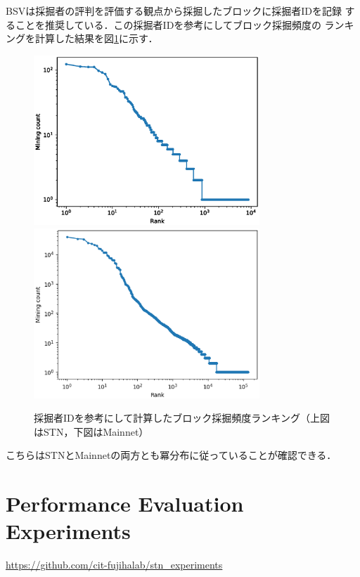 \documentclass[graybox]{svmult}
\begin{document}
BSVは採掘者の評判を評価する観点から採掘したブロックに採掘者IDを記録
することを推奨している．この採掘者IDを参考にしてブロック採掘頻度の
ランキングを計算した結果を図\ref{fig:minerrank}に示す．
%
\begin{figure}[tb]
  \vspace{-20mm}
  \begin{center}
    \includegraphics[width=85mm]{bsv_stn-block_miners-ranking-loglog.eps}
    \includegraphics[width=85mm]{bsv_mainnet-block_miners-ranking-loglog.eps}
  \end{center}
  \vspace{20mm}
  \caption{採掘者IDを参考にして計算したブロック採掘頻度ランキング（上図はSTN，下図はMainnet）}
  \label{fig:minerrank}
\end{figure}
%
こちらはSTNとMainnetの両方とも冪分布に従っていることが確認できる．







\section{Performance Evaluation Experiments}
\label{sec:experiments}


\url{https://github.com/cit-fujihalab/stn_experiments}
\end{document}
